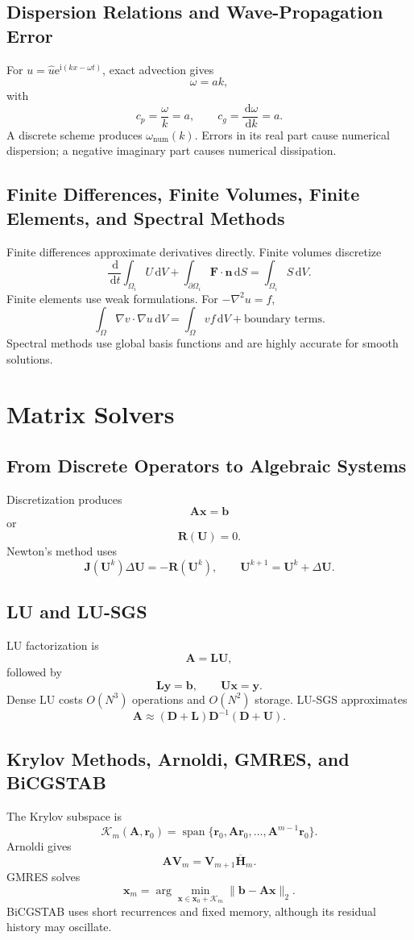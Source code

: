 \documentclass[11pt,openany]{book}
\newcommand{\dd}{\,\mathrm d}
\newcommand{\ee}{\mathrm e}
\newcommand{\ii}{\mathrm i}
\newcommand{\Ksp}{\mathcal K}
\begin{document}
\chapter*{Dispersion Relations and Wave-Propagation Error}
For $u=\widehat u\ee^{\ii(kx-\omega t)}$, exact advection gives
\[
\omega=ak,
\]
with
\[
c_p=\frac{\omega}{k}=a,\qquad c_g=\frac{\dd\omega}{\dd k}=a.
\]
A discrete scheme produces $\omega_{\mathrm{num}}(k)$. Errors in its real part cause numerical dispersion; a negative imaginary part causes numerical dissipation.

\chapter*{Finite Differences, Finite Volumes, Finite Elements, and Spectral Methods}
Finite differences approximate derivatives directly. Finite volumes discretize
\[
\frac{\dd}{\dd t}\int_{\Omega_i}U\dd V+\int_{\partial\Omega_i}\bm F\cdot\bm n\dd S=\int_{\Omega_i}S\dd V.
\]
Finite elements use weak formulations. For $-\nabla^2u=f$,
\[
\int_\Omega\nabla v\cdot\nabla u\dd V=\int_\Omega vf\dd V+\text{boundary terms}.
\]
Spectral methods use global basis functions and are highly accurate for smooth solutions.

\part{Matrix Solvers}

\chapter*{From Discrete Operators to Algebraic Systems}
Discretization produces
\[
\bm A\bm x=\bm b
\]
or
\[
\bm R(\bm U)=0.
\]
Newton's method uses
\[
\bm J(\bm U^k)\Delta\bm U=-\bm R(\bm U^k),\qquad \bm U^{k+1}=\bm U^k+\Delta\bm U.
\]

\chapter*{LU and LU-SGS}
LU factorization is
\[
\bm A=\bm L\bm U,
\]
followed by
\[
\bm L\bm y=\bm b,\qquad \bm U\bm x=\bm y.
\]
Dense LU costs $O(N^3)$ operations and $O(N^2)$ storage. LU-SGS approximates
\[
\bm A\approx(\bm D+\bm L)\bm D^{-1}(\bm D+\bm U).
\]

\chapter*{Krylov Methods, Arnoldi, GMRES, and BiCGSTAB}
The Krylov subspace is
\[
\Ksp_m(\bm A,\bm r_0)=\operatorname{span}\{\bm r_0,\bm A\bm r_0,\dots,\bm A^{m-1}\bm r_0\}.
\]
Arnoldi gives
\[
\bm A\bm V_m=\bm V_{m+1}\overline{\bm H}_m.
\]
GMRES solves
\[
\bm x_m=\arg\min_{\bm x\in\bm x_0+\Ksp_m}\|\bm b-\bm A\bm x\|_2.
\]
BiCGSTAB uses short recurrences and fixed memory, although its residual history may oscillate.
\end{document}
